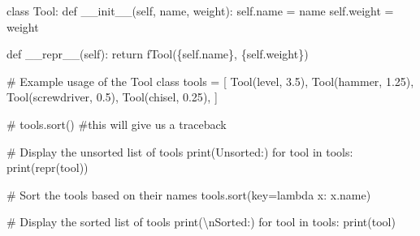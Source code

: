 \documentclass[
]{report}
\newenvironment{Shaded}{\begin{snugshade}}{\end{snugshade}}
\newcommand{\BuiltInTok}[1]{\textcolor[rgb]{0.00,0.23,0.31}{#1}}
\newcommand{\CharTok}[1]{\textcolor[rgb]{0.13,0.47,0.30}{#1}}
\newcommand{\CommentTok}[1]{\textcolor[rgb]{0.37,0.37,0.37}{#1}}
\newcommand{\ControlFlowTok}[1]{\textcolor[rgb]{0.00,0.23,0.31}{#1}}
\newcommand{\FloatTok}[1]{\textcolor[rgb]{0.68,0.00,0.00}{#1}}
\newcommand{\FunctionTok}[1]{\textcolor[rgb]{0.28,0.35,0.67}{#1}}
\newcommand{\KeywordTok}[1]{\textcolor[rgb]{0.00,0.23,0.31}{#1}}
\newcommand{\NormalTok}[1]{\textcolor[rgb]{0.00,0.23,0.31}{#1}}
\newcommand{\OperatorTok}[1]{\textcolor[rgb]{0.37,0.37,0.37}{#1}}
\newcommand{\SpecialCharTok}[1]{\textcolor[rgb]{0.37,0.37,0.37}{#1}}
\newcommand{\SpecialStringTok}[1]{\textcolor[rgb]{0.13,0.47,0.30}{#1}}
\newcommand{\StringTok}[1]{\textcolor[rgb]{0.13,0.47,0.30}{#1}}
\newcommand{\VariableTok}[1]{\textcolor[rgb]{0.07,0.07,0.07}{#1}}
\begin{document}
\begin{Shaded}
\begin{Highlighting}[]
\KeywordTok{class}\NormalTok{ Tool:}
    \KeywordTok{def} \FunctionTok{\_\_init\_\_}\NormalTok{(}\VariableTok{self}\NormalTok{, name, weight):}
        \VariableTok{self}\NormalTok{.name }\OperatorTok{=}\NormalTok{ name}
        \VariableTok{self}\NormalTok{.weight }\OperatorTok{=}\NormalTok{ weight}

    \KeywordTok{def} \FunctionTok{\_\_repr\_\_}\NormalTok{(}\VariableTok{self}\NormalTok{):}
        \ControlFlowTok{return} \SpecialStringTok{f\textquotesingle{}Tool(}\SpecialCharTok{\{}\VariableTok{self}\SpecialCharTok{.}\NormalTok{name}\SpecialCharTok{\}}\SpecialStringTok{, }\SpecialCharTok{\{}\VariableTok{self}\SpecialCharTok{.}\NormalTok{weight}\SpecialCharTok{\}}\SpecialStringTok{)\textquotesingle{}}

\CommentTok{\# Example usage of the Tool class}
\NormalTok{tools }\OperatorTok{=}\NormalTok{ [}
\NormalTok{    Tool(}\StringTok{\textquotesingle{}level\textquotesingle{}}\NormalTok{, }\FloatTok{3.5}\NormalTok{),}
\NormalTok{    Tool(}\StringTok{\textquotesingle{}hammer\textquotesingle{}}\NormalTok{, }\FloatTok{1.25}\NormalTok{),}
\NormalTok{    Tool(}\StringTok{\textquotesingle{}screwdriver\textquotesingle{}}\NormalTok{, }\FloatTok{0.5}\NormalTok{),}
\NormalTok{    Tool(}\StringTok{\textquotesingle{}chisel\textquotesingle{}}\NormalTok{, }\FloatTok{0.25}\NormalTok{),}
\NormalTok{]}

\CommentTok{\# tools.sort()   \#this will give us a traceback}
 
\CommentTok{\# Display the unsorted list of tools}
\BuiltInTok{print}\NormalTok{(}\StringTok{\textquotesingle{}Unsorted:\textquotesingle{}}\NormalTok{)}
\ControlFlowTok{for}\NormalTok{ tool }\KeywordTok{in}\NormalTok{ tools:}
    \BuiltInTok{print}\NormalTok{(}\BuiltInTok{repr}\NormalTok{(tool))}

\CommentTok{\# Sort the tools based on their names}
\NormalTok{tools.sort(key}\OperatorTok{=}\KeywordTok{lambda}\NormalTok{ x: x.name)}

\CommentTok{\# Display the sorted list of tools}
\BuiltInTok{print}\NormalTok{(}\StringTok{\textquotesingle{}}\CharTok{\textbackslash{}n}\StringTok{Sorted:\textquotesingle{}}\NormalTok{)}
\ControlFlowTok{for}\NormalTok{ tool }\KeywordTok{in}\NormalTok{ tools:}
    \BuiltInTok{print}\NormalTok{(tool)}
\end{Highlighting}
\end{Shaded}
\end{document}
